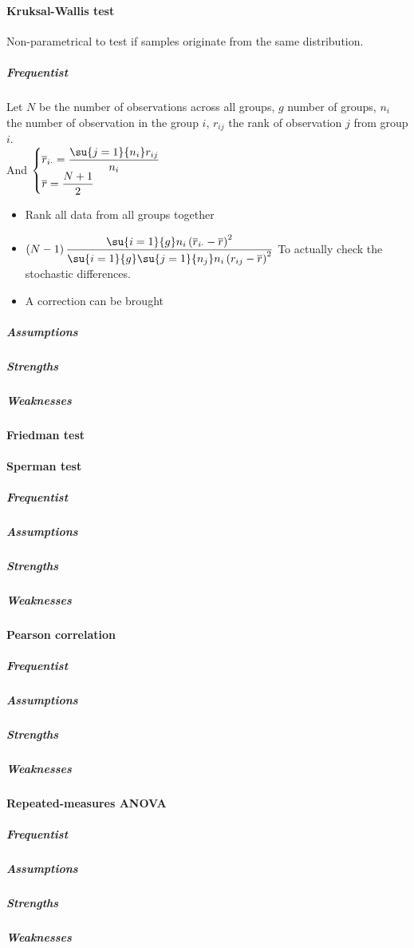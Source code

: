 \paragraph{Kruksal-Wallis test}
Non-parametrical to test if samples originate from the same distribution.
\subparagraph{Frequentist}
Let $N$ be the number of observations across all groups, $g$ number of groups, $n_{i}$ the
number of observation in the group $i$, $r_{ij}$ the rank of observation $j$ from group 
$i$.\\
And 
$\begin{cases}
    \overline{r}_{i\cdot} = \dfrac{\su{j=1}{n_{i}}r_{ij}}{n_{i}} \\
    \overline{r} = \dfrac{N + 1}{2}
\end{cases}$
\begin{itemize}
    \item Rank all data from all groups together
    \item $\left(N-1\right)\dfrac{\su{i=1}{g}n_{i}\left(\overline{r}_{i\cdot} - 
                \overline{r}\right)^{2}}{\su{i=1}{g}\su{j=1}{n_{j}}n_{i}\left(r_{ij} - 
        \overline{r}\right)^{2}}$
        To actually check the stochastic differences.
    \item A correction can be brought

\end{itemize}

\subparagraph{Assumptions}
\subparagraph{Strengths}
\subparagraph{Weaknesses}

\paragraph{Friedman test}
\paragraph{Sperman test}
\subparagraph{Frequentist}
\subparagraph{Assumptions}
\subparagraph{Strengths}
\subparagraph{Weaknesses}

\paragraph{Pearson correlation}
\subparagraph{Frequentist}
\subparagraph{Assumptions}
\subparagraph{Strengths}
\subparagraph{Weaknesses}

\paragraph{Repeated-measures ANOVA}
\subparagraph{Frequentist}
\subparagraph{Assumptions}
\subparagraph{Strengths}
\subparagraph{Weaknesses}

